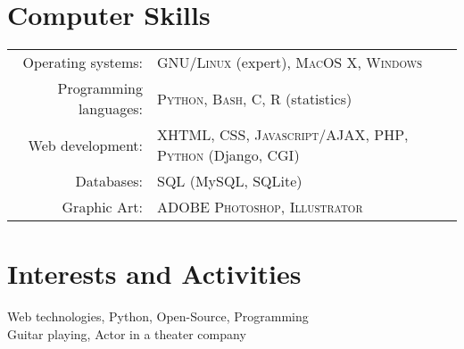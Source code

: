 \documentclass[a4paper,10pt]{article}
\begin{document}

\section{Computer Skills}
\begin{tabular}{rl}
Operating systems:& \textsc{GNU/Linux} (expert), \textsc{MacOS X},  \textsc{Windows}\\
Programming languages:& \textsc{Python}, \textsc{Bash}, \textsc{C}, \textsc{R} (statistics) \\
Web development:& \textsc{XHTML}, \textsc{CSS}, \textsc{Javascript/AJAX}, \textsc{PHP}, \textsc{Python} (Django, CGI)\\
Databases:& \textsc{SQL} (MySQL, SQLite) \\
Graphic Art:& \textsc{ADOBE Photoshop}, \textsc{Illustrator} \\
\end{tabular}

\section{Interests and Activities}
Web technologies, Python, Open-Source, Programming\\
Guitar playing, Actor in a theater company\\
\end{document}
